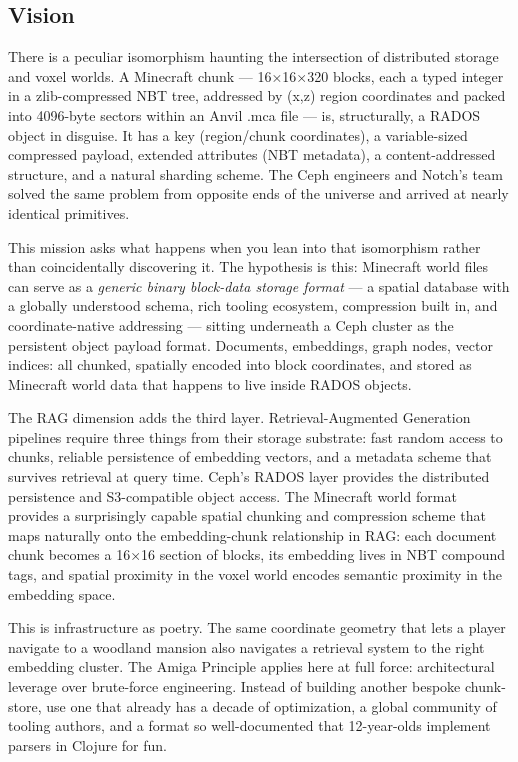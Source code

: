 \documentclass[11pt,letterpaper]{article}
\begin{document}
\subsection{Vision}

There is a peculiar isomorphism haunting the intersection of distributed storage and voxel worlds. A Minecraft chunk --- 16×16×320 blocks, each a typed integer in a zlib-compressed NBT tree, addressed by (x,z) region coordinates and packed into 4096-byte sectors within an Anvil .mca file --- is, structurally, a RADOS object in disguise. It has a key (region/chunk coordinates), a variable-sized compressed payload, extended attributes (NBT metadata), a content-addressed structure, and a natural sharding scheme. The Ceph engineers and Notch's team solved the same problem from opposite ends of the universe and arrived at nearly identical primitives.

This mission asks what happens when you lean into that isomorphism rather than coincidentally discovering it. The hypothesis is this: Minecraft world files can serve as a \textit{generic binary block-data storage format} --- a spatial database with a globally understood schema, rich tooling ecosystem, compression built in, and coordinate-native addressing --- sitting underneath a Ceph cluster as the persistent object payload format. Documents, embeddings, graph nodes, vector indices: all chunked, spatially encoded into block coordinates, and stored as Minecraft world data that happens to live inside RADOS objects.

The RAG dimension adds the third layer. Retrieval-Augmented Generation pipelines require three things from their storage substrate: fast random access to chunks, reliable persistence of embedding vectors, and a metadata scheme that survives retrieval at query time. Ceph's RADOS layer provides the distributed persistence and S3-compatible object access. The Minecraft world format provides a surprisingly capable spatial chunking and compression scheme that maps naturally onto the embedding-chunk relationship in RAG: each document chunk becomes a 16×16 section of blocks, its embedding lives in NBT compound tags, and spatial proximity in the voxel world encodes semantic proximity in the embedding space.

This is infrastructure as poetry. The same coordinate geometry that lets a player navigate to a woodland mansion also navigates a retrieval system to the right embedding cluster. The Amiga Principle applies here at full force: architectural leverage over brute-force engineering. Instead of building another bespoke chunk-store, use one that already has a decade of optimization, a global community of tooling authors, and a format so well-documented that 12-year-olds implement parsers in Clojure for fun.
\end{document}
